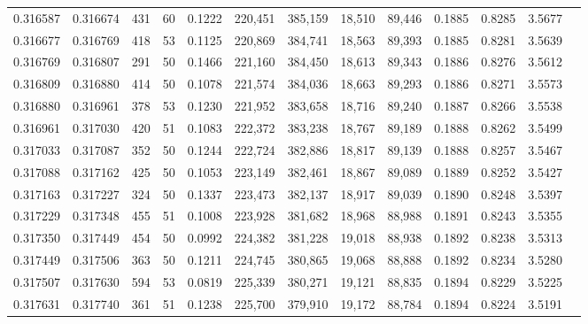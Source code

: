 \begin{tabular}{rrrrrrrrrrrrr}
0.316587 & 0.316674 &   431 &  60 &                                     0.1222 & 220,451 & 385,159 &  18,510 &  89,446 & 0.1885 & 0.8285 & 3.5677 \\
0.316677 & 0.316769 &   418 &  53 &                                     0.1125 & 220,869 & 384,741 &  18,563 &  89,393 & 0.1885 & 0.8281 & 3.5639 \\
0.316769 & 0.316807 &   291 &  50 &                                     0.1466 & 221,160 & 384,450 &  18,613 &  89,343 & 0.1886 & 0.8276 & 3.5612 \\
0.316809 & 0.316880 &   414 &  50 &                                     0.1078 & 221,574 & 384,036 &  18,663 &  89,293 & 0.1886 & 0.8271 & 3.5573 \\
0.316880 & 0.316961 &   378 &  53 &                                     0.1230 & 221,952 & 383,658 &  18,716 &  89,240 & 0.1887 & 0.8266 & 3.5538 \\
0.316961 & 0.317030 &   420 &  51 &                                     0.1083 & 222,372 & 383,238 &  18,767 &  89,189 & 0.1888 & 0.8262 & 3.5499 \\
0.317033 & 0.317087 &   352 &  50 &                                     0.1244 & 222,724 & 382,886 &  18,817 &  89,139 & 0.1888 & 0.8257 & 3.5467 \\
0.317088 & 0.317162 &   425 &  50 &                                     0.1053 & 223,149 & 382,461 &  18,867 &  89,089 & 0.1889 & 0.8252 & 3.5427 \\
0.317163 & 0.317227 &   324 &  50 &                                     0.1337 & 223,473 & 382,137 &  18,917 &  89,039 & 0.1890 & 0.8248 & 3.5397 \\
0.317229 & 0.317348 &   455 &  51 &                                     0.1008 & 223,928 & 381,682 &  18,968 &  88,988 & 0.1891 & 0.8243 & 3.5355 \\
0.317350 & 0.317449 &   454 &  50 &                                     0.0992 & 224,382 & 381,228 &  19,018 &  88,938 & 0.1892 & 0.8238 & 3.5313 \\
0.317449 & 0.317506 &   363 &  50 &                                     0.1211 & 224,745 & 380,865 &  19,068 &  88,888 & 0.1892 & 0.8234 & 3.5280 \\
0.317507 & 0.317630 &   594 &  53 &                                     0.0819 & 225,339 & 380,271 &  19,121 &  88,835 & 0.1894 & 0.8229 & 3.5225 \\
0.317631 & 0.317740 &   361 &  51 &                                     0.1238 & 225,700 & 379,910 &  19,172 &  88,784 & 0.1894 & 0.8224 & 3.5191 \\

\end{tabular}
